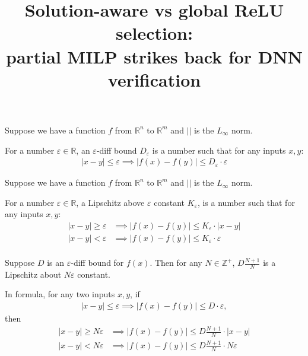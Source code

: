 \documentclass{llncs}
\title{Solution-aware vs global ReLU selection: \\
partial MILP strikes back for DNN verification}
\date{}
\begin{document}
	
	\begin{definition}
	Suppose we have a function $f$ from $\mathbb{R}^n$ to $\mathbb{R}^m$ and $||$ is the $L_\infty$ norm. 
			
	For a number $\varepsilon\in\mathbb{R}$, an $\varepsilon$-diff bound $D_\varepsilon$ is a number such that for any inputs $x,y$: \begin{align*}
	|x-y|\leq \varepsilon \implies |f(x)-f(y)| \leq D_\varepsilon \cdot \varepsilon
\end{align*}
			
	\end{definition}
	
	
\begin{definition}
	Suppose we have a function $f$ from $\mathbb{R}^n$ to $\mathbb{R}^m$ and $||$ is the $L_\infty$ norm. 
	
	For a number $\varepsilon\in\mathbb{R}$, a Lipschitz above $\varepsilon$ constant  $K_\varepsilon$,  is a number such that for any inputs $x,y$: \begin{align*}
	|x-y|\geq \varepsilon &\implies |f(x)-f(y)| \leq K_\varepsilon \cdot |x-y|\\
	|x-y|<\varepsilon &\implies |f(x)-f(y)| \leq K_\varepsilon \cdot \varepsilon\\
	\end{align*}
	
\end{definition}


\begin{proposition}
	
	Suppose $D$ is an $\varepsilon$-diff bound for $f(x)$. Then for any $N\in\mathbb{Z}^+$, $D\frac{N+1}{N}$ is a Lipschitz about $N\varepsilon$ constant.
	
	In formula, for any two inputs $x,y$, if \begin{align*}
		|x-y|\leq \varepsilon \implies |f(x)-f(y)| \leq D \cdot \varepsilon,
	\end{align*} then 	 \begin{align*}
	|x-y|\geq N\varepsilon &\implies |f(x)-f(y)| \leq D\frac{N+1}{N} \cdot |x-y|\\
	|x-y|<N\varepsilon &\implies |f(x)-f(y)| \leq D\frac{N+1}{N} \cdot N\varepsilon\\
	\end{align*}
\end{proposition}
\end{document}
